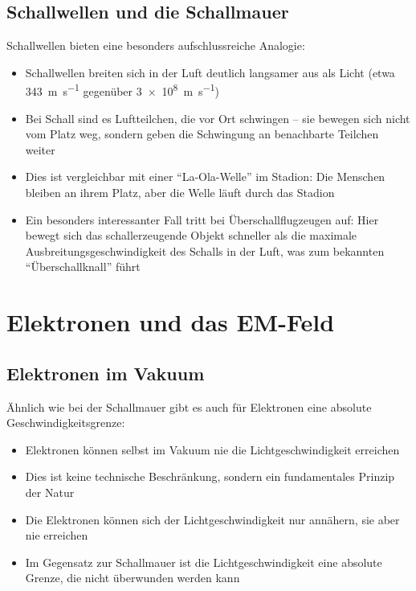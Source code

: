 \documentclass[12pt,a4paper]{article}
\begin{document}
\subsection{Schallwellen und die Schallmauer}
Schallwellen bieten eine besonders aufschlussreiche Analogie:
\begin{itemize}
    \item Schallwellen breiten sich in der Luft deutlich langsamer aus als Licht (etwa \SI{343}{\meter\per\second} gegenüber \SI{3e8}{\meter\per\second})
    \item Bei Schall sind es Luftteilchen, die vor Ort schwingen -- sie bewegen sich nicht vom Platz weg, sondern geben die Schwingung an benachbarte Teilchen weiter
    \item Dies ist vergleichbar mit einer ``La-Ola-Welle'' im Stadion: Die Menschen bleiben an ihrem Platz, aber die Welle läuft durch das Stadion
    \item Ein besonders interessanter Fall tritt bei Überschallflugzeugen auf: Hier bewegt sich das schallerzeugende Objekt schneller als die maximale Ausbreitungsgeschwindigkeit des Schalls in der Luft, was zum bekannten ``Überschallknall'' führt
\end{itemize}

\section{Elektronen und das EM-Feld}
\subsection{Elektronen im Vakuum}
Ähnlich wie bei der Schallmauer gibt es auch für Elektronen eine absolute Geschwindigkeitsgrenze:
\begin{itemize}
    \item Elektronen können selbst im Vakuum nie die Lichtgeschwindigkeit erreichen
    \item Dies ist keine technische Beschränkung, sondern ein fundamentales Prinzip der Natur
    \item Die Elektronen können sich der Lichtgeschwindigkeit nur annähern, sie aber nie erreichen
    \item Im Gegensatz zur Schallmauer ist die Lichtgeschwindigkeit eine absolute Grenze, die nicht überwunden werden kann
\end{itemize}
\end{document}
